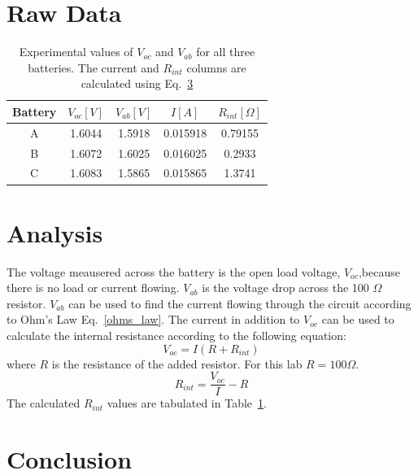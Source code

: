 \documentclass{report}
\begin{document}
\section{Raw Data}
\begin{table}
    \begin{center}
    \caption{Experimental values of $V_{oc}$ and $V_{ab}$ for all three batteries. The current and $R_{int}$ columns are calculated using Eq.~\ref{}}
    \label{tab:results}
    \begin{tabular}{|c c c c c|}
        \hline
        Battery & $V_{oc} [V]$ & $V_{ab} [V]$ & $ I[A]$ & $R_{int} [\Omega]$\\
        \hline
        A      &   1.6044    &  1.5918     &  0.015918     &  0.79155 \\
        B   & 1.6072    & 1.6025 &  0.016025 & 0.2933 \\
        C   & 1.6083    & 1.5865    & 0.015865  & 1.3741 \\
        \hline

    \end{tabular}
    \end{center}
    \end{table}
\section{Analysis}
The voltage meausered across the battery is the open load voltage, $V_{oc}$,because there is no load or current flowing.
$V_{ab}$ is the voltage drop across the 100 $\Omega$ resistor.
$V_{ab}$ can be used to find the current flowing through the circuit according to Ohm's Law Eq.~\ref{ohms_law}.
The current in addition to $V_{oc}$ can be used to calculate the internal resistance according to the following equation:
\begin{equation}
    V_{oc} = I(R+R_{int})
\end{equation}
where $R$ is the resistance of the added resistor.
For this lab $R = 100 \Omega$.
\begin{equation}
    R_{int} = \frac{V_{oc}}{I}-R
\end{equation}
The calculated $R_{int}$ values are tabulated in Table~\ref{tab:results}.
\section{Conclusion}
\end{document}
